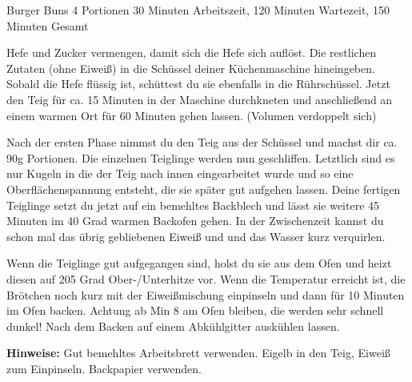 \begin{recipe}{Burger Buns} {4 Portionen} {30 Minuten Arbeitszeit, 120 Minuten Wartezeit, 150 Minuten Gesamt}

  \freeform
  \textit{}


  Hefe und Zucker vermengen, damit sich die Hefe sich auflöst.
  Die restlichen Zutaten (ohne Eiweiß) in die Schüssel deiner Küchenmaschine hineingeben.
  Sobald die Hefe flüssig ist, schüttest du sie ebenfalls in die Rührschüssel.
  Jetzt den Teig für ca. 15 Minuten in der Maschine durchkneten und anschließend an einem warmen Ort für 60 Minuten gehen lassen. (Volumen verdoppelt sich)

  \newstep
  Nach der ersten Phase nimmst du den Teig aus der Schüssel und machst dir ca. 90g Portionen.
  Die einzelnen Teiglinge werden nun geschliffen.
  Letztlich sind es nur Kugeln in die der Teig nach innen eingearbeitet wurde und so eine Oberflächenspannung entsteht, die sie später gut aufgehen lassen.
  Deine fertigen Teiglinge setzt du jetzt auf ein bemehltes Backblech und lässt sie weitere 45 Minuten im 40 Grad warmen Backofen gehen.
  In der Zwischenzeit kannst du schon mal das übrig gebliebenen Eiweiß und und das Wasser kurz verquirlen.

  \newstep
  Wenn die Teiglinge gut aufgegangen sind, holst du sie aus dem Ofen und heizt diesen auf 205 Grad Ober-/Unterhitze vor.
  Wenn die Temperatur erreicht ist, die Brötchen noch kurz mit der Eiweißmischung einpinseln und dann für 10 Minuten im Ofen backen.
  Achtung ab Min 8 am Ofen bleiben, die werden sehr schnell dunkel! Nach dem Backen auf einem Abkühlgitter auskühlen lassen.

  \freeform
  \hrulefill

  \freeform
  \textbf{Hinweise:}
  Gut bemehltes Arbeitsbrett verwenden. Eigelb in den Teig, Eiweiß zum Einpinseln. Backpapier verwenden.

\end{recipe}
